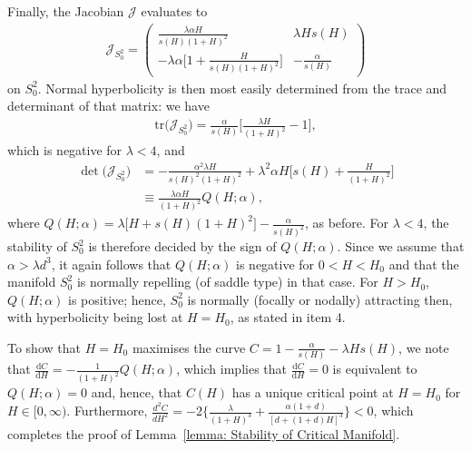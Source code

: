 \documentclass{article}
\theoremstyle{definition}
\numberwithin{equation}{section}
\newcommand{\dd}{\mathrm{d}}
\begin{document}
Finally, the Jacobian $\mathcal{J}$ evaluates to
\begin{align*}
    \mathcal{J}_{S_0^2} = \begin{pmatrix}
        \frac{\lambda\alpha H}{s(H)(1+H)^2} & \lambda H s(H) \\
        -\lambda\alpha\Big[1+\frac{H}{s(H)(1+H)^2}\Big] & -\frac{\alpha}{s(H)}
    \end{pmatrix}
\end{align*}
on $S_0^2$. Normal hyperbolicity is then most easily determined from the trace and determinant of that matrix: we have
\begin{align*}
    \mathrm{tr}\big(\mathcal{J}_{S_0^2}\big) = \frac{\alpha}{s(H)}\bigg[\frac{\lambda H}{(1+H)^2}-1\bigg],
\end{align*}
which is negative for $\lambda <4$,  and
\begin{align*}
    \det\big(\mathcal{J}_{S_0^2}\big) &=-\frac{\alpha^2\lambda H}{s(H)^2(1+H)^2}+\lambda^2\alpha H\bigg[s(H)+\frac{H}{(1+H)^2}\bigg] \\
    &\equiv \frac{\lambda \alpha H}{(1+H)^2}Q(H;\alpha),
\end{align*}
where $Q(H;\alpha) = \lambda \big[H+s(H)(1+H)^2\big]-\frac{\alpha}{s(H)^2}$, as before.
For $\lambda < 4$, the stability of $S_0^2$ is therefore decided by the sign of $Q(H;\alpha)$. Since we assume that $\alpha>\lambda d^3$, it again follows that $Q(H;\alpha)$ is negative for $0 <H<H_0$ and that the manifold $S_0^2$ is normally repelling (of saddle type) in that case. For $H>H_0$, $Q(H;\alpha)$ is positive; hence, $S_0^2$ is normally (focally or nodally) attracting then, with hyperbolicity being lost at $H=H_0$, as stated in item 4. 

To show that $H=H_0$ maximises the curve $C=1-\frac{\alpha}{s(H)}-\lambda H s(H)$, we note that $\frac{\dd C}{\dd H}=-\frac{1}{(1+H)^2}Q(H;\alpha)$, which implies that $\frac{\dd C}{\dd H}=0$ is equivalent to $Q(H;\alpha)=0$ and, hence, that $C(H)$ has a unique critical point at $H=H_0$ for $H\in[0, \infty)$. Furthermore, 
$\frac{d^2 C}{dH^2}=-2\Big\{\frac{\lambda}{(1+H)^3}+\frac{\alpha(1+d)}{[d+(1+d)H]^3} \Big\}<0$, which completes the proof of Lemma~\ref{lemma: Stability of Critical Manifold}.
\end{document}
